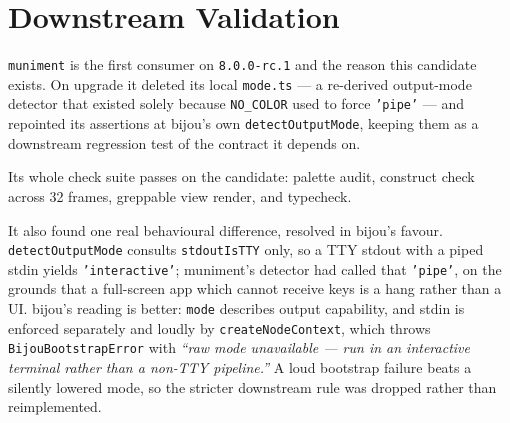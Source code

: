 \section{Downstream Validation}\label{record-262-downstream-validation}

\texttt{m\allowbreak{}u\allowbreak{}n\allowbreak{}i\allowbreak{}m\allowbreak{}e\allowbreak{}n\allowbreak{}t} is the first consumer on \texttt{8\allowbreak{}.\allowbreak{}0\allowbreak{}.\allowbreak{}0\allowbreak{}-\allowbreak{}r\allowbreak{}c\allowbreak{}.\allowbreak{}1} and the reason this candidate exists. On upgrade it deleted its local \texttt{m\allowbreak{}o\allowbreak{}d\allowbreak{}e\allowbreak{}.\allowbreak{}t\allowbreak{}s} --- a re-derived output-mode detector that existed solely because \texttt{N\allowbreak{}O\allowbreak{}\_\allowbreak{}C\allowbreak{}O\allowbreak{}L\allowbreak{}O\allowbreak{}R} used to force \texttt{'\allowbreak{}p\allowbreak{}i\allowbreak{}p\allowbreak{}e\allowbreak{}'} --- and repointed its assertions at bijou's own \texttt{d\allowbreak{}e\allowbreak{}t\allowbreak{}e\allowbreak{}c\allowbreak{}t\allowbreak{}O\allowbreak{}u\allowbreak{}t\allowbreak{}p\allowbreak{}u\allowbreak{}t\allowbreak{}M\allowbreak{}o\allowbreak{}d\allowbreak{}e}, keeping them as a downstream regression test of the contract it depends on.

Its whole check suite passes on the candidate: palette audit, construct check across 32 frames, greppable view render, and typecheck.

It also found one real behavioural difference, resolved in bijou's favour. \texttt{d\allowbreak{}e\allowbreak{}t\allowbreak{}e\allowbreak{}c\allowbreak{}t\allowbreak{}O\allowbreak{}u\allowbreak{}t\allowbreak{}p\allowbreak{}u\allowbreak{}t\allowbreak{}M\allowbreak{}o\allowbreak{}d\allowbreak{}e} consults \texttt{s\allowbreak{}t\allowbreak{}d\allowbreak{}o\allowbreak{}u\allowbreak{}t\allowbreak{}I\allowbreak{}s\allowbreak{}T\allowbreak{}T\allowbreak{}Y} only, so a TTY stdout with a piped stdin yields \texttt{'\allowbreak{}i\allowbreak{}n\allowbreak{}t\allowbreak{}e\allowbreak{}r\allowbreak{}a\allowbreak{}c\allowbreak{}t\allowbreak{}i\allowbreak{}v\allowbreak{}e\allowbreak{}'}; muniment's detector had called that \texttt{'\allowbreak{}p\allowbreak{}i\allowbreak{}p\allowbreak{}e\allowbreak{}'}, on the grounds that a full-screen app which cannot receive keys is a hang rather than a UI. bijou's reading is better: \texttt{m\allowbreak{}o\allowbreak{}d\allowbreak{}e} describes output capability, and stdin is enforced separately and loudly by \texttt{c\allowbreak{}r\allowbreak{}e\allowbreak{}a\allowbreak{}t\allowbreak{}e\allowbreak{}N\allowbreak{}o\allowbreak{}d\allowbreak{}e\allowbreak{}C\allowbreak{}o\allowbreak{}n\allowbreak{}t\allowbreak{}e\allowbreak{}x\allowbreak{}t}, which throws \texttt{B\allowbreak{}i\allowbreak{}j\allowbreak{}o\allowbreak{}u\allowbreak{}B\allowbreak{}o\allowbreak{}o\allowbreak{}t\allowbreak{}s\allowbreak{}t\allowbreak{}r\allowbreak{}a\allowbreak{}p\allowbreak{}E\allowbreak{}r\allowbreak{}r\allowbreak{}o\allowbreak{}r} with \emph{``raw mode unavailable --- run in an interactive terminal rather than a non-TTY pipeline.''} A loud bootstrap failure beats a silently lowered mode, so the stricter downstream rule was dropped rather than reimplemented.

